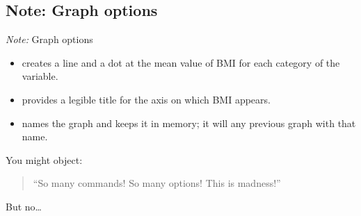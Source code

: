 \documentclass{beamer}
\begin{document}
	\subsection{Note: Graph options}

	\begin{frame}[t]{\textit{Note:} Graph options}
	
		\vspace{1em}
					
		\begin{itemize}
			\item {} creates a line and a dot at the mean value of BMI for each category of the  variable.

			\item {} provides a legible title for the axis on which BMI appears.

			\item {} names the graph  and keeps it in memory; it will  any previous graph with that name.
		\end{itemize}
	
		You might object:\\[.5em]
		
		\begin{quote}``So many commands! So many options! This is madness!''\end{quote}
		
		But no…			
	\end{frame}
	
		
	
\end{document}
